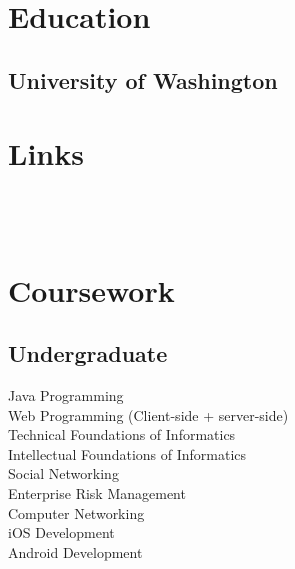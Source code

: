 \documentclass[]{deedy-resume-openfont}
\begin{document}
\begin{minipage}[t]{0.39\textwidth} 


\section{Education} 

\subsection{University of Washington}
\sectionsep


\section{Links} 
\href{https://github.com/yulongtan}{} \\
\href{https://www.linkedin.com/in/yulongtan}{} \\
\sectionsep


\section{Coursework}

\subsection{Undergraduate}
Java Programming \\
Web Programming (Client-side + server-side) \\
Technical Foundations of Informatics \\
Intellectual Foundations of Informatics \\
Social Networking \\
Enterprise Risk Management \\
Computer Networking \\
iOS Development \\
Android Development
\sectionsep



\end{minipage}
\end{document}
